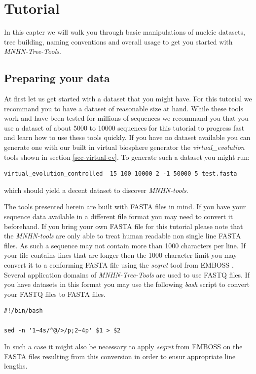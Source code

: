 \chapter{Tutorial}

In this capter we will walk you through basic manipulations of nucleic
datasets, tree building, naming conventions and overall usage to get
you started with \emph{MNHN-Tree-Tools}.

\section{Preparing your data}

At first let us get started with a dataset that you might have. For this
tutorial we recommand you to have a dataset of reasonable size at
hand. While these tools work and have been tested for millions of
sequences we recommand you that you use a dataset of about 5000 to
10000 sequences for this tutorial to progress fast and learn how to
use these tools quickly. If you have no dataset available you can
generate one with our built in virtual biosphere generator the
\emph{virtual\_evolution} tools shown in section
\ref{sec-virtual-ev}. To generate such a dataset you might run:
\begin{lstlisting}
virtual_evolution_controlled  15 100 10000 2 -1 50000 5 test.fasta
\end{lstlisting}
which should yield a decent dataset to discover \emph{MNHN-tools}.

The tools presented herein are built with FASTA \cite{fasta} files in mind. If
you have your sequence data available in a different file format you
may need to convert it beforehand. If you bring your own FASTA file
for this tutorial please note that the \emph{MNHN-tools} are only able
to treat human readable non single line FASTA files. 
As such a sequence may not contain more than 1000 characters per line.
If your file contains lines that are longer then the 1000 character
limit you may convert it to
a conforming FASTA file using the \emph{seqret} tool from EMBOSS
\cite{emboss}.
Several application domains of \emph{MNHN-Tree-Tools} are used to use FASTQ files.
If you have datasets in this format you may use the following
\emph{bash} script to convert your FASTQ files to FASTA files. 
\begin{lstlisting}
#!/bin/bash

sed -n '1~4s/^@/>/p;2~4p' $1 > $2
\end{lstlisting}
In such a case it might also be necessary to apply \emph{seqret} from
EMBOSS on the FASTA files resulting from this conversion in order to
ensur appropriate line lengths. 

